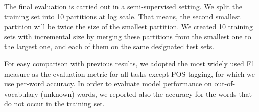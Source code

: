 The final evaluation is carried out in a semi-supervised setting. We split the training set into 10 partitions at log scale. That means, the second smallest partition will be twice the size of the smallest partition. We created 10 training sets with incremental size by merging these partitions from the smallest one to the largest one, and each of them on the same designated test sets. 

For easy comparison with previous results, we adopted the most widely used F1 measure as the evaluation metric for all tasks except POS tagging, for which we use per-word accuracy. In order to evaluate model performance on out-of-vocabulary (unknown) words, we reported also the accuracy for the words that do not occur in the training set.




